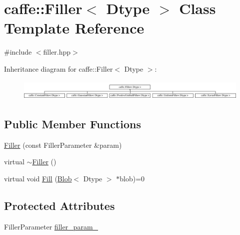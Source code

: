 \hypertarget{classcaffe_1_1_filler}{\section{caffe\+:\+:Filler$<$ Dtype $>$ Class Template Reference}
\label{classcaffe_1_1_filler}
}


{\ttfamily \#include $<$filler.\+hpp$>$}

Inheritance diagram for caffe\+:\+:Filler$<$ Dtype $>$\+:\begin{figure}[H]
\begin{center}
\leavevmode
\includegraphics[height=0.991150cm]{classcaffe_1_1_filler}
\end{center}
\end{figure}
\subsection*{Public Member Functions}
\begin{DoxyCompactItemize}
\item 
\hyperlink{classcaffe_1_1_filler_aff156b1d4e5dbbbad720aa776df44512}{Filler} (const Filler\+Parameter \&param)
\item 
virtual \hyperlink{classcaffe_1_1_filler_af24dcc49f4309797a2c0ee830f111dc7}{$\sim$\+Filler} ()
\item 
virtual void \hyperlink{classcaffe_1_1_filler_acd02177b669381252a7c484f51432d30}{Fill} (\hyperlink{classcaffe_1_1_blob}{Blob}$<$ Dtype $>$ $\ast$blob)=0
\end{DoxyCompactItemize}
\subsection*{Protected Attributes}
\begin{DoxyCompactItemize}
\item 
Filler\+Parameter \hyperlink{classcaffe_1_1_filler_a1ded14cf43eeb7b45628770842c4348c}{filler\+\_\+param\+\_\+}
\end{DoxyCompactItemize}


